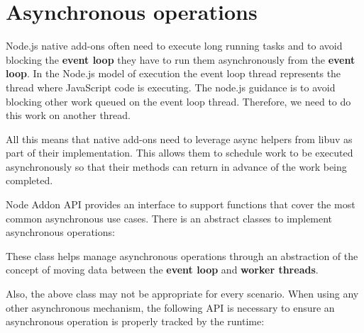 \chapter{Asynchronous operations}
\hypertarget{md__2_users_2hello_2_documents_2_git_hub_2finalproject-engine-drop-table-engines_2_engine_2src_29e0fc6d9e899f865bc8516295092586e}{}\label{md__2_users_2hello_2_documents_2_git_hub_2finalproject-engine-drop-table-engines_2_engine_2src_29e0fc6d9e899f865bc8516295092586e}
\label{md__2_users_2hello_2_documents_2_git_hub_2finalproject-engine-drop-table-engines_2_engine_2src_29e0fc6d9e899f865bc8516295092586e_autotoc_md7628}%
%


Node.\+js native add-\/ons often need to execute long running tasks and to avoid blocking the {\bfseries{event loop}} they have to run them asynchronously from the {\bfseries{event loop}}. In the Node.\+js model of execution the event loop thread represents the thread where Java\+Script code is executing. The node.\+js guidance is to avoid blocking other work queued on the event loop thread. Therefore, we need to do this work on another thread.

All this means that native add-\/ons need to leverage async helpers from libuv as part of their implementation. This allows them to schedule work to be executed asynchronously so that their methods can return in advance of the work being completed.

Node Addon API provides an interface to support functions that cover the most common asynchronous use cases. There is an abstract classes to implement asynchronous operations\+:


\begin{DoxyItemize}
\item {\bfseries{}}
\end{DoxyItemize}

These class helps manage asynchronous operations through an abstraction of the concept of moving data between the {\bfseries{event loop}} and {\bfseries{worker threads}}.

Also, the above class may not be appropriate for every scenario. When using any other asynchronous mechanism, the following API is necessary to ensure an asynchronous operation is properly tracked by the runtime\+:


\begin{DoxyItemize}
\item {\bfseries{}}
\item {\bfseries{}} 
\end{DoxyItemize}